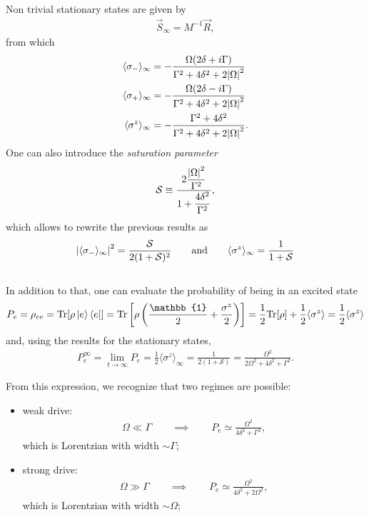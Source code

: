 Non trivial stationary states are given by 
\begin{align*}
    \vec{S}_\infty = M^{-1} \vec{R}, 
\end{align*}
from which 
\begin{align*}
    \langle \sigma_- \rangle_\infty & = -\frac{\Omega (2 \delta + i \Gamma)}{\Gamma^2 + 4 \delta^2 + 2 \abs{\Omega}^2} \\
     \langle \sigma_+ \rangle_\infty & = -\frac{\Omega (2 \delta - i \Gamma)}{\Gamma^2 + 4 \delta^2 + 2 \abs{\Omega}^2} \\
      \langle \sigma^z \rangle_\infty & = -\frac{\Gamma^2 + 4 \delta^2}{\Gamma^2 + 4 \delta^2 + 2 \abs{\Omega}^2}. 
\end{align*}
One can also introduce the \textit{saturation parameter}
\begin{align}
    \mathcal{S} \equiv \frac{2\dfrac{\abs{\Omega}^2}{\Gamma^2}}{1+\dfrac{4\delta^2}{\Gamma^2}}, 
\end{align}
which allows to rewrite the previous results as 
\begin{align}
    \abs{\langle \sigma_- \rangle_\infty }^2 = \frac{\mathcal{S}}{2(1+\mathcal{S})^2} \qquad \text{and} \qquad \langle \sigma^z \rangle_\infty = \frac{1}{1+\mathcal{S}} 
\end{align}
\\

\noindent In addition to that, one can evaluate the probability of being in an excited state
\begin{align*}
    P_e = \rho_{ee} = \text{Tr}[\rho \ket{e}\bra{e}] = \text{Tr}\left[ \rho \left( \frac{\mathbb{1}}{2} + \frac{\sigma^z}{2} \right)\right] = \frac{1}{2} \text{Tr}[\rho] + \frac{1}{2} \langle \sigma^z \rangle = \frac{1}{2} \langle \sigma^z \rangle
\end{align*}
and, using the results for the stationary states, 
\begin{align*}
    P_e^\infty = \lim_{t\to \infty} P_e = \frac{1}{2}\langle \sigma^z \rangle_\infty =  \frac{1}{2(1+\mathcal{S})} =\frac{\Omega^2}{2\Omega^2 + 4 \delta^2 + \Gamma^2}. 
\end{align*}

\begin{center}
\scalebox{1.4}{  }
\end{center}


\noindent From this expression, we recognize that two regimes are possible: 
\begin{itemize}
    \item weak drive: 
    \begin{align*}
        \Omega \ll \Gamma \qquad \implies \qquad P_e \simeq \frac{\Omega^2}{4 \delta^2 + \Gamma^2}, 
    \end{align*} 
    which is Lorentzian with width $\sim \Gamma$; 
    \item strong drive: 
    \begin{align*}
        \Omega \gg \Gamma \qquad \implies \qquad P_e \simeq \frac{\Omega^2}{4 \delta^2 + 2\Omega^2}, 
    \end{align*} 
    which is Lorentzian with width $\sim \Omega$; 
\end{itemize}

